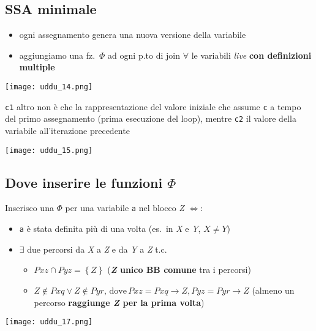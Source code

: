 \subsection{SSA minimale}

\noindent \begin{minipage}[c]{.6\textwidth}
  \begin{itemize}
    \item ogni assegnamento genera una nuova versione della variabile
    \item aggiungiamo una fz.~$\Phi$ ad ogni p.to di join $\forall$ le variabili \textit{live} \textbf{con definizioni multiple} 
  \end{itemize}
\end{minipage}\hfill
\begin{minipage}[c]{.25\textwidth}
  \texttt{[image: uddu\_14.png]}
\end{minipage}

\begin{example}[frametitle={Esempio con loop}]
  \noindent\begin{minipage}[c]{.5\textwidth}
    \lstinline|c1| altro non \`e che la rappresentazione del valore iniziale che assume \lstinline|c| a tempo del primo assegnamento (prima esecuzione del loop), mentre \lstinline|c2| il valore della variabile all'iterazione precedente
  \end{minipage}\hfill
  \begin{minipage}[c]{.45\textwidth}
    \texttt{[image: uddu\_15.png]}
  \end{minipage}
\end{example}

\subsection{Dove inserire le funzioni $\Phi$}

\noindent \begin{minipage}[c]{.7\textwidth}
  Inserisco una $\Phi$ per una variabile \lstinline|a| nel blocco \textit{Z} $\iff$:
  \begin{itemize}
    \item \lstinline|a| \`e stata definita pi\`u di una volta (es.~in \textit{X} e \textit{Y}, $X\neq Y$)
    \item $\exists$ due percorsi da \textit{X} a \textit{Z} e da \textit{Y} a \textit{Z} t.c.
      \begin{itemize}
        \item $Pxz \cap Pyz = \left\lbrace Z \right\rbrace$ (\textbf{\textit{Z} unico BB comune} tra i percorsi)
        \item $Z \notin Pxq \lor Z \notin Pyr,\, \text{dove}\, Pxz = Pxq \rightarrow Z, Pyz = Pyr \rightarrow Z$ (almeno un percorso \textbf{raggiunge \textit{Z} per la prima volta})
      \end{itemize}
  \end{itemize}
\end{minipage}\hfill
\begin{minipage}[c]{.25\textwidth}
  \texttt{[image: uddu\_17.png]}
\end{minipage}

